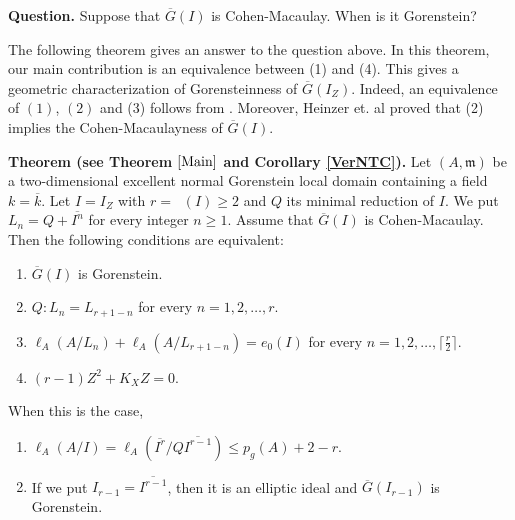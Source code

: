 \documentclass[12pt]{amsart}
\theoremstyle{definition}
\theoremstyle{remark}
\numberwithin{equation}{section}
\DeclareMathOperator{\br}{\bar r}
\newcommand{\m}{\mathfrak m}
\renewcommand{\:}{\colon}
\begin{document}
\par \vspace{2mm} \par \noindent 
{\bf Question.}
Suppose that  $\overline{G}(I)$ is Cohen-Macaulay. 
When is it Gorenstein? 

\par  \vspace{2mm} 
 The following theorem gives an answer to the question above. 
In this theorem,  our main contribution is an equivalence between (1) 
and (4). 
This gives a geometric characterization of Gorensteinness of $\overline{G}(I_Z)$. 
Indeed, an equivalence of $(1)$, $(2)$ and (3) follows from 
\cite[Theorem 4.4]{HKU}. 
Moreover, Heinzer et. al \cite[Theorem 3.12]{HKU} 
proved that (2) implies the Cohen-Macaulayness of 
$\overline{G}(I)$. 

\par \vspace{3mm} \par \noindent 
{\bf Theorem (see Theorem $\ref{Main}$ and Corollary \ref{VerNTC}).}
Let $(A,\m)$ be a two-dimensional excellent normal Gorenstein local 
domain containing a field $k=\overline{k}$. 
Let $I=I_Z$ with $r=\br(I) \ge 2$ and $Q$ its minimal reduction of $I$. 
 We put $L_n=Q+\overline{I^n}$ for every integer $n \ge 1$. 
Assume that $\overline{G}(I)$ is Cohen-Macaulay. 
Then the following conditions are equivalent$:$
\begin{enumerate}
\item $\overline{G}(I)$ is Gorenstein. 
\item 
$Q \colon L_n=L_{r+1-n}$ for every $n=1,2,\ldots, r$. 
\item
$\ell_A(A/L_n)+\ell_A(A/L_{r+1-n})=e_0(I)$ for  every $n=1,2,\ldots,\lceil \frac{r}{2} \rceil$. 
\item $(r-1)Z^2+K_XZ=0$. 
\end{enumerate}
When this is the case, 
\begin{enumerate}
\item[$(i)$] $\ell_A(A/I) = \ell_A(\overline{I^{r}}/Q\overline{I^{r-1}}) 
\le p_g(A)+2-r$.   
\item[$(ii)$] If we put $I_{r-1}=\overline{I^{r-1}}$, then it is an elliptic ideal and $\overline{G}(I_{r-1})$ is Gorenstein.  
\end{enumerate}
\end{document}
